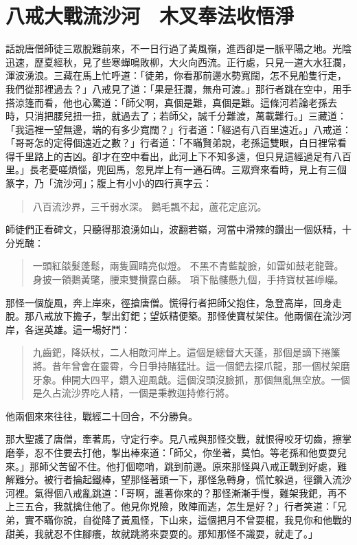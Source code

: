 
\chapter{八戒大戰流沙河　木叉奉法收悟淨}

話說唐僧師徒三眾脫難前來，不一日行過了黃風嶺，進西卻是一脈平陽之地。光陰迅速，歷夏經秋，見了些寒蟬鳴敗柳，大火向西流。正行處，只見一道大水狂瀾，渾波湧浪。三藏在馬上忙呼道：「徒弟，你看那前邊水勢寬闊，怎不見船隻行走，我們從那裡過去？」八戒見了道：「果是狂瀾，無舟可渡。」那行者跳在空中，用手搭涼篷而看，他也心驚道：「師父啊，真個是難，真個是難。這條河若論老孫去時，只消把腰兒扭一扭，就過去了；若師父，誠千分難渡，萬載難行。」三藏道：「我這裡一望無邊，端的有多少寬闊？」行者道：「經過有八百里遠近。」八戒道：「哥哥怎的定得個遠近之數？」行者道：「不瞞賢弟說，老孫這雙眼，白日裡常看得千里路上的吉凶。卻才在空中看出，此河上下不知多遠，但只見這經過足有八百里。」長老憂嗟煩惱，兜回馬，忽見岸上有一通石碑。三眾齊來看時，見上有三個篆字，乃「流沙河」；腹上有小小的四行真字云：
\begin{quote}
八百流沙界，三千弱水深。
鵝毛飄不起，蘆花定底沉。
\end{quote}

師徒們正看碑文，只聽得那浪湧如山，波翻若嶺，河當中滑辣的鑽出一個妖精，十分兇醜：
\begin{quote}
一頭紅燄髮蓬鬆，兩隻圓睛亮似燈。
不黑不青藍靛臉，如雷如鼓老龍聲。
身披一領鵝黃氅，腰束雙攢露白藤。
項下骷髏懸九個，手持寶杖甚崢嶸。
\end{quote}

那怪一個旋風，奔上岸來，徑搶唐僧。慌得行者把師父抱住，急登高岸，回身走脫。那八戒放下擔子，掣出釘鈀；望妖精便築。那怪使寶杖架住。他兩個在流沙河岸，各逞英雄。這一場好鬥：
\begin{quote}
九齒鈀，降妖杖，二人相敵河岸上。這個是總督大天蓬，那個是謫下捲簾將。昔年曾會在靈霄，今日爭持賭猛壯。這一個鈀去探爪龍，那一個杖架磨牙象。伸開大四平，鑽入迎風戧。這個沒頭沒臉抓，那個無亂無空放。一個是久占流沙界吃人精，一個是秉教迦持修行將。
\end{quote}

他兩個來來往往，戰經二十回合，不分勝負。

那大聖護了唐僧，牽著馬，守定行李。見八戒與那怪交戰，就恨得咬牙切齒，擦掌磨拳，忍不住要去打他，掣出棒來道：「師父，你坐著，莫怕。等老孫和他耍耍兒來。」那師父苦留不住。他打個唿哨，跳到前邊。原來那怪與八戒正戰到好處，難解難分。被行者掄起鐵棒，望那怪著頭一下，那怪急轉身，慌忙躲過，徑鑽入流沙河裡。氣得個八戒亂跳道：「哥啊，誰著你來的？那怪漸漸手慢，難架我鈀，再不上三五合，我就擒住他了。他見你兇險，敗陣而逃，怎生是好？」行者笑道：「兄弟，實不瞞你說，自從降了黃風怪，下山來，這個把月不曾耍棍，我見你和他戰的甜美，我就忍不住腳癢，故就跳將來耍耍的。那知那怪不識耍，就走了。」


